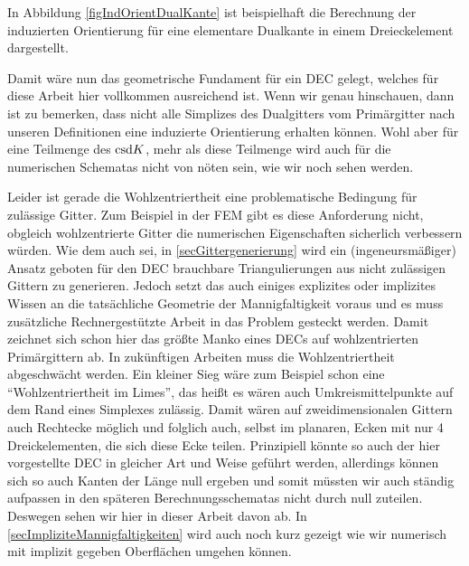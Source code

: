     In Abbildung \ref{figIndOrientDualKante} ist beispielhaft die Berechnung der induzierten Orientierung für eine elementare Dualkante in einem Dreieckelement dargestellt. 

  \begin{fazit}
    Damit wäre nun das geometrische Fundament für ein DEC gelegt, welches für diese Arbeit hier vollkommen ausreichend ist.
    Wenn wir genau hinschauen, dann ist zu bemerken, dass nicht alle Simplizes des Dualgitters vom Primärgitter nach unseren Definitionen eine induzierte Orientierung erhalten können.
    Wohl aber für eine Teilmenge des \( \text{csd} K \), mehr als diese Teilmenge wird auch für die
    numerischen Schematas nicht von nöten sein, wie wir noch sehen werden.
    
    Leider ist gerade die Wohlzentriertheit eine problematische Bedingung für zulässige Gitter.
    Zum Beispiel in der FEM gibt es diese Anforderung nicht, obgleich wohlzentrierte Gitter die numerischen Eigenschaften sicherlich verbessern würden.
    Wie dem auch sei, in \ref{secGittergenerierung} wird ein (ingeneursmäßiger) Ansatz geboten für den DEC brauchbare Triangulierungen aus nicht zulässigen Gittern zu generieren.
    Jedoch setzt das auch einiges explizites oder implizites Wissen an die tatsächliche Geometrie der Mannigfaltigkeit voraus und es muss zusätzliche Rechnergestützte Arbeit in das Problem
    gesteckt werden. Damit zeichnet sich schon hier das größte Manko eines DECs auf wohlzentrierten Primärgittern ab.
    In zukünftigen Arbeiten muss die Wohlzentriertheit abgeschwächt werden.
    Ein kleiner Sieg wäre zum Beispiel schon eine "`Wohlzentriertheit im Limes"', das heißt es wären auch Umkreismittelpunkte auf dem Rand eines Simplexes zulässig.
    Damit wären auf zweidimensionalen Gittern auch Rechtecke möglich und folglich auch, selbst im planaren, Ecken mit nur 4 Dreickelementen, die sich diese Ecke teilen.
    Prinzipiell könnte so auch der hier vorgestellte DEC in gleicher Art und Weise geführt werden, allerdings können sich so auch Kanten der Länge null ergeben und somit müssten wir auch
    ständig aufpassen in den späteren Berechnungsschematas nicht durch null zuteilen. Deswegen sehen wir hier in dieser Arbeit davon ab.
    In \ref{secImpliziteMannigfaltigkeiten} wird auch noch kurz gezeigt wie wir numerisch mit implizit gegeben Oberflächen umgehen können.
  \end{fazit}










